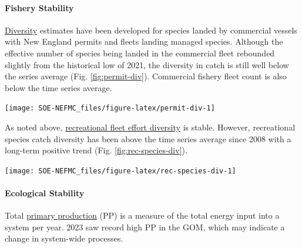 \documentclass[
  10pt,
]{article}
\let\origfigure\figure
\let\endorigfigure\endfigure
\renewenvironment{figure}[1][2] {
    \expandafter\origfigure\expandafter[H]
} {
    \endorigfigure
}
\begin{document}
\hypertarget{fishery-stability}{%
\paragraph{Fishery Stability}\label{fishery-stability}}

\href{https://noaa-edab.github.io/catalog/commercial-catch-and-fleet-diversity.html}{Diversity} estimates have been developed for species landed by commercial vessels with New England permits and fleets landing managed species. Although the effective number of species being landed in the commercial fleet rebounded slightly from the historical low of 2021, the diversity in catch is still well below the series average (Fig. \ref{fig:permit-div}). Commercial fishery fleet count is also below the time series average.

\begin{figure}

{\centering \texttt{[image: SOE-NEFMC\_files/figure-latex/permit-div-1]} 

}

\caption{Species revenue diversity in New England.}\label{fig:permit-div}
\end{figure}

As noted above, \href{https://noaa-edab.github.io/catalog/recreational-fishing-indicators.html}{recreational fleet effort diversity} is stable. However, recreational species catch diversity has been above the time series average since 2008 with a long-term positive trend (Fig. \ref{fig:rec-species-div}).

\begin{figure}

{\centering \texttt{[image: SOE-NEFMC\_files/figure-latex/rec-species-div-1]} 

}

\caption{Diversity of recreational catch in New England.}\label{fig:rec-species-div}
\end{figure}

\hypertarget{ecological-stability}{%
\paragraph{Ecological Stability}\label{ecological-stability}}

Total \href{https://noaa-edab.github.io/catalog/phytoplankton-chlorophyll-size-class-and-primary-production.html}{primary production} (PP) is a measure of the total energy input into a system per year. 2023 saw record high PP in the GOM, which may indicate a change in system-wide processes.
\end{document}
